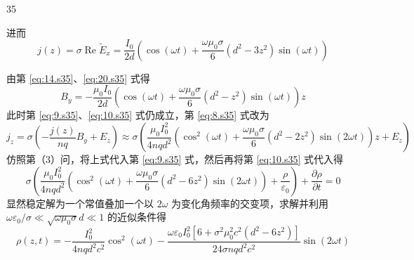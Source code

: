 \begin{solution}{35}
\begin{subsolution}
\begin{equation}
            \label{eq:19.s35}
        \end{equation}
        进而
        \begin{equation}
            j (z) = \sigma \operatorname{Re} \tilde {E} _ {x} = \frac {I _ {0}}{2 d} \left(\cos (\omega t) + \frac {\omega \mu_ {0} \sigma}{6} (d ^ {2} - 3 z ^ {2}) \sin (\omega t)\right)
            \label{eq:20.s35}
        \end{equation}
    \end{subsolution}
    \begin{subsolution}
        由第 \eqref{eq:14.s35}、\eqref{eq:20.s35} 式得
        \begin{equation}
            B _ {y} = - \frac {\mu_ {0} I _ {0}}{2 d} \left(\cos (\omega t) + \frac {\omega \mu_ {0} \sigma}{6} (d ^ {2} - z ^ {2}) \sin (\omega t)\right) z
            \label{eq:21.s35}
        \end{equation}
        此时第 \eqref{eq:9.s35}、\eqref{eq:10.s35} 式仍成立，第 \eqref{eq:8.s35} 式改为
        \begin{equation}
            j _ {z} = \sigma \left(- \frac {j (z)}{n q} B _ {y} + E _ {z}\right) \approx \sigma \left(\frac {\mu_ {0} I _ {0} ^ {2}}{4 n q d ^ {2}} \left(\cos^ {2} (\omega t) + \frac {\omega \mu_ {0} \sigma}{6} (d ^ {2} - 2 z ^ {2}) \sin (2 \omega t)\right) z + E _ {z}\right)
            \label{eq:22.s35}
        \end{equation}
        仿照第（3）问，将上式代入第 \eqref{eq:9.s35} 式，然后再将第 \eqref{eq:10.s35} 式代入得
        \begin{equation}
            \sigma \left(\frac {\mu_ {0} I _ {0} ^ {2}}{4 n q d ^ {2}} \left(\cos^ {2} (\omega t) + \frac {\omega \mu_ {0} \sigma}{6} (d ^ {2} - 6 z ^ {2}) \sin (2 \omega t)\right) + \frac {\rho}{\varepsilon_ {0}}\right) + \frac {\partial \rho}{\partial t} = 0
            \label{eq:23.s35}
        \end{equation}
        显然稳定解为一个常值叠加一个以 $2\omega$ 为变化角频率的交变项，求解并利用 $\omega \varepsilon_0 / \sigma \ll \sqrt{\omega \mu_0\sigma} d\ll 1$ 的近似条件得
        \begin{equation}
            \rho (z, t) = - \frac {I _ {0} ^ {2}}{4 n q d ^ {2} c ^ {2}} \cos^ {2} (\omega t) - \frac {\omega \varepsilon_ {0} I _ {0} ^ {2} [ 6 + \sigma^ {2} \mu_ {0} ^ {2} c ^ {2} (d ^ {2} - 6 z ^ {2}) ]}{2 4 \sigma n q d ^ {2} c ^ {2}} \sin (2 \omega t)
            \label{eq:24.s35}
        \end{equation}
    \end{subsolution}

\end{solution}
